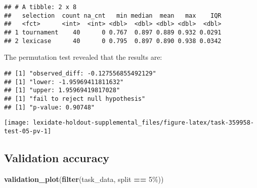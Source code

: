 \documentclass[
]{book}
\newenvironment{Shaded}{\begin{snugshade}}{\end{snugshade}}
\newcommand{\AttributeTok}[1]{\textcolor[rgb]{0.13,0.29,0.53}{#1}}
\newcommand{\DecValTok}[1]{\textcolor[rgb]{0.00,0.00,0.81}{#1}}
\newcommand{\FunctionTok}[1]{\textcolor[rgb]{0.13,0.29,0.53}{\textbf{#1}}}
\newcommand{\NormalTok}[1]{#1}
\newcommand{\OtherTok}[1]{\textcolor[rgb]{0.56,0.35,0.01}{#1}}
\newcommand{\SpecialCharTok}[1]{\textcolor[rgb]{0.81,0.36,0.00}{\textbf{#1}}}
\newcommand{\StringTok}[1]{\textcolor[rgb]{0.31,0.60,0.02}{#1}}
\begin{document}
\begin{verbatim}
## # A tibble: 2 x 8
##   selection  count na_cnt   min median  mean   max    IQR
##   <fct>      <int>  <int> <dbl>  <dbl> <dbl> <dbl>  <dbl>
## 1 tournament    40      0 0.767  0.897 0.889 0.932 0.0291
## 2 lexicase      40      0 0.795  0.897 0.890 0.938 0.0342
\end{verbatim}

The permutation test revealed that the results are:

\begin{Shaded}
\end{Shaded}

\begin{verbatim}
## [1] "observed_diff: -0.127556855492129"
## [1] "lower: -1.95969411811632"
## [1] "upper: 1.95969419817028"
## [1] "fail to reject null hypothesis"
## [1] "p-value: 0.90748"
\end{verbatim}

\texttt{[image: lexidate-holdout-supplemental\_files/figure-latex/task-359958-test-05-pv-1]}

\hypertarget{validation-accuracy-30}{%
\subsection{Validation accuracy}\label{validation-accuracy-30}}

\begin{Shaded}
\begin{Highlighting}[]
\FunctionTok{validation\_plot}\NormalTok{(}\FunctionTok{filter}\NormalTok{(task\_data, split }\SpecialCharTok{==} \StringTok{\textquotesingle{}5\%\textquotesingle{}}\NormalTok{))}
\end{Highlighting}
\end{Shaded}
\end{document}
